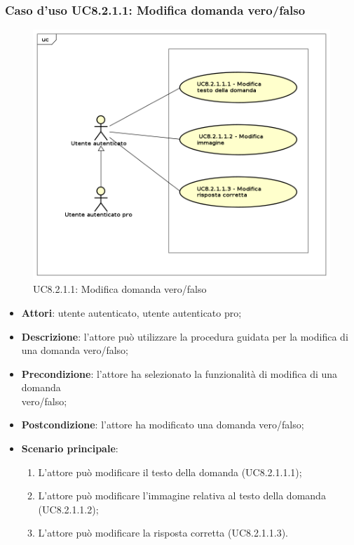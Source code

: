 \subsubsection{Caso d'uso UC8.2.1.1: Modifica domanda vero/falso}
	\label{UC8.2.1.1}
	\begin{figure}[h]
		\centering
			\includegraphics[scale=0.45,keepaspectratio]{UML/UC8_2_1_1.png}
		\caption{UC8.2.1.1: Modifica domanda vero/falso}
	\end{figure}
	\FloatBarrier
	\begin{itemize}
		\item
			\textbf{Attori}: utente autenticato, utente autenticato pro;
		\item		
			\textbf{Descrizione}: l'attore può utilizzare la procedura guidata per la modifica di una domanda vero/falso;
		\item
			\textbf{Precondizione}: l'attore ha selezionato la funzionalità di modifica di una domanda \\vero/falso; 
		\item
			\textbf{Postcondizione}: l'attore ha modificato una domanda vero/falso;
		\item
			\textbf{Scenario principale}:
	       		\begin{enumerate}
	       			\item
	       			L'attore può modificare il testo della domanda (UC8.2.1.1.1);
	       			\item
	       			L'attore può modificare l'immagine relativa al testo della domanda (UC8.2.1.1.2);
					\item
					L'attore può modificare la risposta corretta (UC8.2.1.1.3).
	 			\end{enumerate}
	\end{itemize}
	
